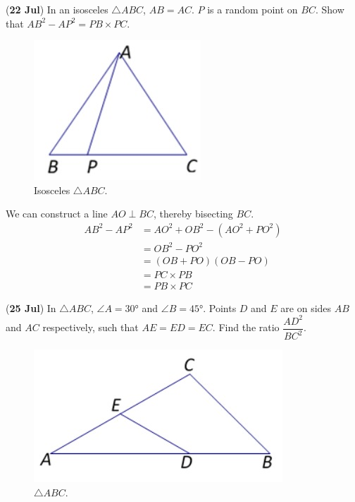 \documentclass[12pt,answers]{exam}
\renewcommand{\frac}[2]{\dfrac{#1}{#2}}
\newcommand{\qndate}[2]{(\textbf{#1 #2})}
\begin{document}
\begin{questions}
  \question \qndate{22}{Jul} In an isosceles $\triangle ABC$, $AB=AC$. $P$ is a
  random point on $BC$. Show that ${AB}^2 - {AP}^2 = PB \times PC$.
  \begin{figure}[htpb]
    \centering
    \includegraphics[scale=.6]{images/0722_Tri.jpeg}
    \caption{Isosceles $\triangle ABC$.}
    \label{fig:0722_Tri}
  \end{figure}
  \begin{solution}
    We can construct a line $AO \perp BC$, thereby bisecting $BC$.
    \begin{align*}
      AB^2 - AP^2 & = AO^2 + OB^2 - \left(AO^2 + PO^2\right) \\
      & = OB^2 - PO^2                            \\
      & = (OB+PO)(OB-PO)                         \\
      & = PC \times PB                           \\
      & = PB \times PC
    \end{align*}
  \end{solution}

  \question \qndate{25}{Jul} In $\triangle ABC$, $\angle A =
  \ang{30}$ and $\angle B = \ang{45}$.
  Points $D$ and $E$ are on sides $AB$ and $AC$ respectively, such
  that $AE=ED=EC$.
  Find the ratio $\frac{AD^2}{BC^2}$.
  \begin{figure}[htpb]
    \centering
    \includegraphics[scale=.6]{images/0725_Tri.jpeg}
    \caption{$\triangle ABC$.}
    \label{fig:0725_Tri}
  \end{figure}


\end{questions}
\end{document}
